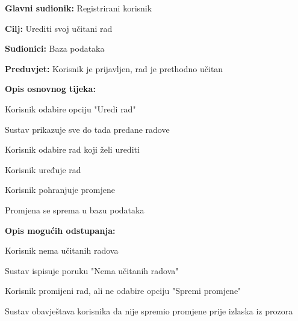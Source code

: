 	\noindent {}
	\begin{packed_item}
		
		\item \textbf{Glavni sudionik: }Registrirani korisnik
		\item  \textbf{Cilj:} Urediti svoj učitani rad
		\item  \textbf{Sudionici:} Baza podataka
		\item  \textbf{Preduvjet:} Korisnik je prijavljen, rad je prethodno učitan
		\item  \textbf{Opis osnovnog tijeka:}
		
		\item[] \begin{packed_enum}
			
			\item Korisnik odabire opciju "Uredi rad"
			\item Sustav prikazuje sve do tada predane radove
			\item Korisnik odabire rad koji želi urediti
			\item Korisnik uređuje rad
			\item Korisnik pohranjuje promjene
			\item Promjena se sprema u bazu podataka
		\end{packed_enum}
		
		\item  \textbf{Opis mogućih odstupanja:}
		
		\item[] \begin{packed_item}
			
			\item[2.a] Korisnik nema učitanih radova
			\item[] \begin{packed_enum}
				\item Sustav ispisuje poruku "Nema učitanih radova"
			
			\end{packed_enum}
	
			\item[4.a] Korisnik promijeni rad, ali ne odabire opciju "Spremi promjene"
			\item[] \begin{packed_enum}
				\item Sustav obavještava korisnika da nije spremio promjene prije izlaska iz prozora
			
			\end{packed_enum}
		\end{packed_item}
	\end{packed_item}

